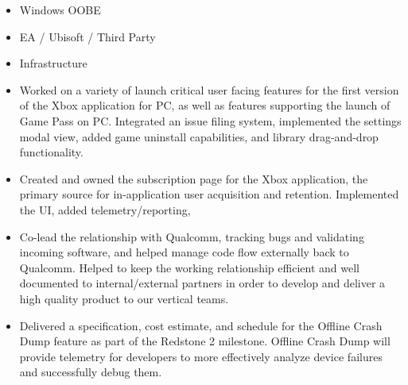 \documentclass[10pt,letterpaper,ragged2e,withhyper]{altacv}
\begin{document}
\begin{paracol}{2}

\begin{itemize}
\item Windows OOBE
\item EA / Ubisoft / Third Party
\item Infrastructure
\end{itemize}

\divider

\begin{itemize}
\item Worked on a variety of launch critical user facing features for the first version of the Xbox application for PC, as well as features supporting the launch of Game Pass on PC. Integrated an issue filing system, implemented the settings modal view, added game uninstall capabilities, and library drag-and-drop functionality.
\item Created and owned the subscription page for the Xbox application, the primary source for in-application user acquisition and retention. Implemented the UI, added telemetry/reporting,  
\end{itemize}

\divider

\begin{itemize}
\item Co-lead the relationship with Qualcomm, tracking bugs and validating incoming software, and helped manage code flow externally back to Qualcomm. Helped to keep the working relationship efficient and well documented to internal/external partners in order to develop and deliver a high quality product to our vertical teams.
\item Delivered a specification, cost estimate, and schedule for the Offline Crash Dump feature as part of the Redstone 2 milestone. Offline Crash Dump will provide telemetry for developers to more effectively analyze device failures and successfully debug them.
\end{itemize}

\divider


\end{paracol}
\end{document}
